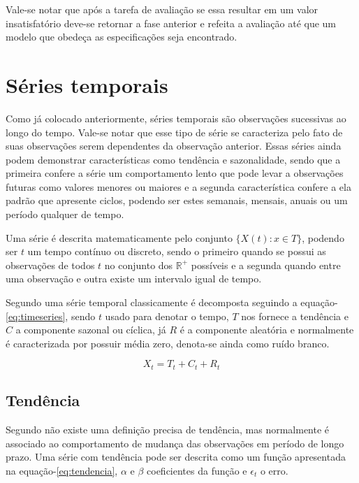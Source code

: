 \documentclass[
	12pt,
	oneside,
	a4paper,
	english,
	brazil
]{abntex2}
\begin{document}
Vale-se notar que após a tarefa de avaliação se essa resultar em um valor 
insatisfatório deve-se retornar a fase anterior e refeita a avaliação até que um 
modelo que obedeça as especificações seja encontrado.

\section{Séries temporais}

Como já colocado anteriormente, séries temporais são observações sucessivas ao 
longo do tempo. Vale-se notar que esse tipo de série se caracteriza pelo fato de 
suas observações serem dependentes da observação anterior. Essas séries ainda 
podem demonstrar características como tendência e sazonalidade, sendo que a 
primeira confere a série um comportamento lento que pode levar a observações 
futuras como valores menores ou maiores e a segunda característica confere a ela 
padrão que apresente ciclos, podendo ser estes semanais, mensais, anuais ou um 
período qualquer de tempo.

Uma série é descrita matematicamente pelo conjunto $\{X(t): x \in T\}$, podendo 
ser $t$ um tempo contínuo ou discreto, sendo o primeiro quando se possui as 
observações de todos $t$ no conjunto dos $\mathbb{R}^{+}$ possíveis e a segunda 
quando entre uma observação e outra existe um intervalo igual de tempo.

Segundo  uma série temporal classicamente é decomposta 
seguindo a equação-\ref{eq:timeseries}, sendo $t$ usado para denotar o tempo, 
$T$ nos fornece a tendência e $C$ a componente sazonal ou cíclica, já $R$ é a 
componente aleatória e normalmente é caracterizada por possuir média zero, 
denota-se ainda como ruído branco.

\begin{equation}
	\label{eq:timeseries}
	X_t = T_t + C_t + R_t
\end{equation}

\subsection{Tendência}

Segundo  não existe uma definição precisa de tendência, mas 
normalmente é associado ao comportamento de mudança das observações em período 
de longo prazo. Uma série com tendência pode ser descrita como um função 
apresentada na equação-\ref{eq:tendencia}, $\alpha$ e $\beta{}$ coeficientes da 
função e $\epsilon{}_t$ o erro.
\end{document}
